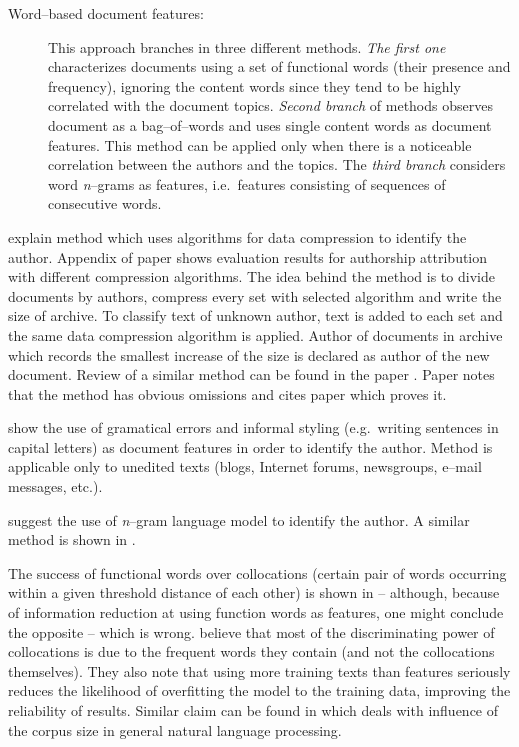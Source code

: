 \documentclass[11pt,english]{article}
\begin{document}
\begin{multicols}{2}
\begin{description}
\item[Word--based document features:] This approach branches in three different
methods. \emph{The first one} characterizes documents using a set of functional
words (their presence and frequency), ignoring the content words since they tend
to be highly correlated with the document topics. \emph{Second branch} of methods
observes document as a bag--of--words and uses single content words as document
features. This method can be applied only when there is a noticeable correlation
between the authors and the topics. The \emph{third branch} considers word
\emph{n}--grams as features, i.e.\ features consisting of sequences of
consecutive words.
\end{description}

\citet{kukushkina2001using} explain method which uses algorithms for data
compression to identify the author. Appendix of paper shows evaluation results
for authorship attribution with different compression algorithms. The idea behind
the method is to divide documents by authors, compress every set with selected
algorithm and write the size of archive. To classify text of unknown author,
text is added to each set and the same data compression algorithm is applied. Author of
documents in archive which records the smallest increase of the size is declared
as author of the new document. Review of a similar method can be found in the
paper \citep{zhao2005effective}. Paper notes that the method has obvious
omissions and cites paper which proves it.

\citet{koppel2003exploiting} show the use of gramatical errors and informal
styling (e.g.\ writing sentences in capital letters) as document features in
order to identify the author. Method is applicable only to unedited texts (blogs,
Internet forums, newsgroups, e--mail messages, etc.).

\citet{peng2003language} suggest the use of \emph{n}--gram language model to identify
the author. A similar method is shown in \citep{coyotl2006authorship}.

The success of functional words over collocations (certain pair of words
occurring within a given threshold distance of each other) is shown in
\citep{argamon2005measuring} -- although, because of information reduction at
using function words as features, one might conclude the opposite -- which is
wrong. \citet{argamon2005measuring} believe that most of the discriminating power
of collocations is due to the frequent words they contain (and not the
collocations themselves). They also note that using more training texts than
features seriously reduces the likelihood of overfitting the model to the
training data, improving the reliability of results. Similar claim can be found
in \citep{banko2001scaling} which deals with influence of the corpus size in
general natural language processing.


\end{multicols}
\end{document}

